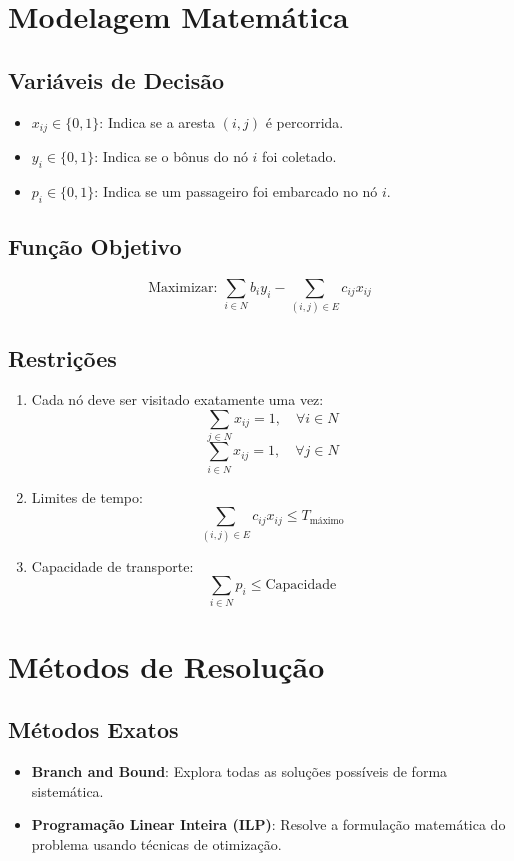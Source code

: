 \documentclass[12pt, a4paper]{report}
\begin{document}
\chapter{Modelagem Matemática}

\section{Variáveis de Decisão}
\begin{itemize}
    \item $x_{ij} \in \{0, 1\}$: Indica se a aresta $(i, j)$ é percorrida.
    \item $y_i \in \{0, 1\}$: Indica se o bônus do nó $i$ foi coletado.
    \item $p_i \in \{0, 1\}$: Indica se um passageiro foi embarcado no nó $i$.
\end{itemize}

\section{Função Objetivo}
\[
\text{Maximizar: } \sum_{i \in N} b_i y_i - \sum_{(i,j) \in E} c_{ij} x_{ij}
\]
\section{Restrições}
\begin{enumerate}
    \item Cada nó deve ser visitado exatamente uma vez:
    \[
    \sum_{j \in N} x_{ij} = 1, \quad \forall i \in N
    \]
    \[
    \sum_{i \in N} x_{ij} = 1, \quad \forall j \in N
    \]
    \item Limites de tempo:
    \[
    \sum_{(i,j) \in E} c_{ij} x_{ij} \leq T_{\text{máximo}}
    \]
    \item Capacidade de transporte:
    \[
    \sum_{i \in N} p_i \leq \text{Capacidade}
    \]
\end{enumerate}

\chapter{Métodos de Resolução}

\section{Métodos Exatos}
\begin{itemize}
    \item \textbf{Branch and Bound}: Explora todas as soluções possíveis de forma sistemática.
    \item \textbf{Programação Linear Inteira (ILP)}: Resolve a formulação matemática do problema usando técnicas de otimização.
\end{itemize}
\end{document}

